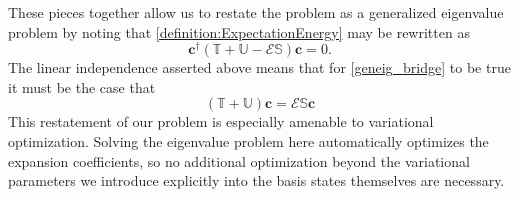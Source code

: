 These pieces together allow us to restate the problem as a generalized
eigenvalue problem by noting that \ref{definition:ExpectationEnergy} may be
rewritten as
\begin{equation}
  \bm{c}^{\dagger}
  \left(\bm{\mathbb{T}}+\bm{\mathbb{U}}-\mathcal{E}\bm{\mathbb{S}}\right)
  \bm{c}
  =
  0.
  \label{geneig_bridge}
\end{equation}
The linear independence asserted above means that for \ref{geneig_bridge} to be
true it must be the case that
\begin{equation}
  \left(\bm{\mathbb{T}}+\bm{\mathbb{U}}\right)\bm{c}
  =
  \mathcal{E}\bm{\mathbb{S}}\bm{c}
  \label{gen_ev}
\end{equation}
This restatement of our problem is especially amenable to variational
optimization. Solving the eigenvalue problem here automatically optimizes the
expansion coefficients, so no additional optimization beyond the variational
parameters we introduce explicitly into the basis states themselves are
necessary.